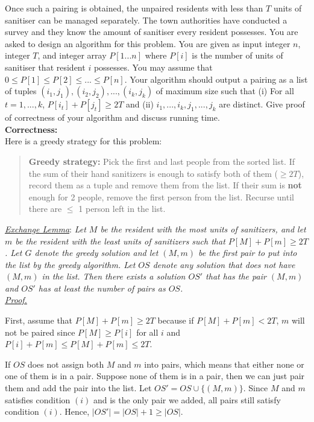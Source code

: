 \documentclass{exam}
\begin{document}
\begin{questions}
Once such a pairing is obtained, the unpaired residents with less than $T$ units of sanitiser can be  managed separately. The town authorities have conducted a survey and they know the amount of sanitiser every  resident possesses. You are asked to design an algorithm for this problem. You are given as input integer $n$,  integer $T$, and integer array $P[1...n]$ where $P[i]$ is the number of units of sanitiser that resident $i$ possesses. You may assume that $0 \leq P[1] \leq P[2] \leq ... \leq P[n]$. 
Your algorithm should output a pairing as a list of tuples $(i_1, j_1), (i_2, j_2), ..., (i_k, j_k)$ of maximum size such that (i) For all $t = 1, ..., k$, $P[i_t] + P[j_t] \geq 2T$ and (ii) $i_1, ..., i_k, j_1, ..., j_k$ are distinct.
Give proof of correctness of your algorithm and discuss running time.\\

{\bf Correctness:}\\
Here is a greedy strategy for this problem:
\begin{quote}
	{\bf Greedy strategy:} Pick the first and last people from the sorted list. If the sum of their hand sanitizers is enough to satisfy both of them ($\geq 2T$), record them as a tuple and remove them from the list. If their sum is {\bf not} enough for 2 people, remove the first person from the list. Recurse until there are $\leq$ 1 person left in the list.\\
\end{quote}

\underline{\it Exchange Lemma}: {\it Let $M$ be the resident with the most units of sanitizers, and let $m$ be the resident with the least units of sanitizers such that $P[M]+P[m]\geq 2T$. Let $G$ denote the greedy solution and let $(M,m)$ be the first pair to put into the list by the greedy algorithm. Let $OS$ denote any solution that does not have $(M,m)$ in the list. Then there exists a solution $OS'$ that has the pair $(M,m)$ and $OS'$ has at least the number of pairs as $OS$.}\\

\underline{\it Proof.}

First, assume that $P[M]+P[m]\geq 2T$ because if $P[M]+P[m]<2T$, $m$ will not be paired since $P[M]\geq P[i]$ for all $i$ and $P[i]+P[m]\leq P[M]+P[m]\leq 2T$.

If $OS$ does not assign both $M$ and $m$ into pairs, which means that either none or one of them is in a pair. Suppose none of them is in a pair, then we can just pair them and add the pair into the list. Let $OS'=OS\cup \{(M,m)\}$. Since $M$ and $m$ satisfies condition $(i)$ and is the only pair we added, all pairs still satisfy condition $(i)$. Hence, $|OS'|=|OS|+1\geq |OS|$. 


\end{questions}
\end{document}
